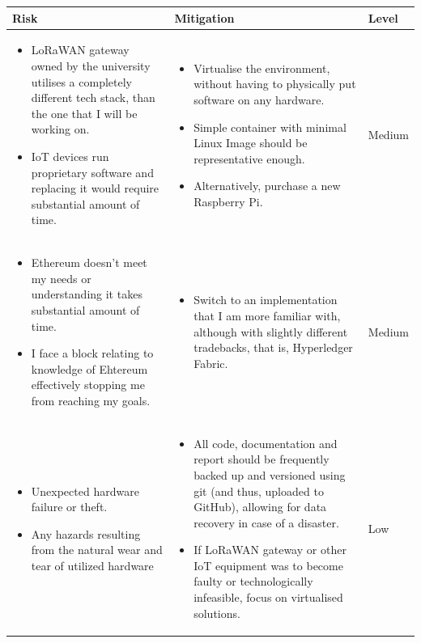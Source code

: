 \documentclass[a4paper,12pt]{article}
\begin{document}
\bgroup
\def\arraystretch{2}
\begin{table}[H]
\centering
\begin{tabular}{|m{}|m{}|m{}|}
\hline
\textbf{Risk} & \textbf{Mitigation}                       & \textbf{Level} \\ \hline
\begin{itemize}[leftmargin=*]
  \item LoRaWAN gateway owned by the university utilises a completely different tech stack, than the one that I will be working on.
  \item IoT devices run proprietary software and replacing it would require substantial amount of time.
\end{itemize} &
\begin{itemize}[leftmargin=*]
  \item Virtualise the environment, without having to physically put software on any hardware.
  \item Simple container with minimal Linux Image should be representative enough.
  \item Alternatively, purchase a new Raspberry Pi.
\end{itemize} &
Medium \\ \hline
\begin{itemize}[leftmargin=*]
  \item Ethereum doesn't meet my needs or understanding it takes substantial amount of time.
  \item I face a block relating to knowledge of Ehtereum effectively stopping me from reaching my goals.
\end{itemize} &
\begin{itemize}[leftmargin=*]
  \item Switch to an implementation that I am more familiar with, although with slightly different tradebacks, that is, Hyperledger Fabric.
\end{itemize} &
Medium \\ \hline
\begin{itemize}[leftmargin=*]
  \item Unexpected hardware failure or theft.
  \item Any hazards resulting from the natural wear and tear of utilized hardware
\end{itemize} &
\begin{itemize}[leftmargin=*]
  \item All code, documentation and report should be frequently backed up and versioned using git (and thus, uploaded to GitHub), allowing for data recovery in case of a disaster.
  \item If LoRaWAN gateway or other IoT equipment was to become faulty or technologically infeasible, focus on virtualised solutions.
\end{itemize} &
Low \\ \hline
\end{tabular}
\end{table}
\egroup
\end{document}
